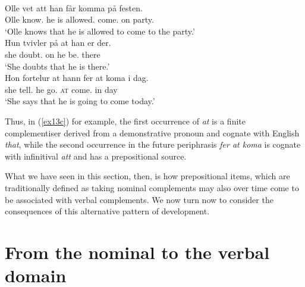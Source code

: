 \documentclass[output=paper]{langsci/langscibook}
\begin{document}
\begin{exe}
\ex\label{ex13}
\begin{xlist}
\ex\label{ex13a} \\
\gll Olle vet att han f\aa r komma {p\aa} festen.\\
Olle know.\Prs{} \Comp{} he {is allowed.\Prs{}} come.\Inf{} on party.\Def{}\\
\trans \enquote*{Olle knows that he is allowed to come to the party.}
\ex\label{ex13b} \\
\gll Hun tvivler {p\aa} at han er der.\\
she doubt.\Prs{} on \Comp{} he be.\Prs{} there\\
\trans \enquote*{She doubts that he is there.}
\ex\label{ex13c} \\
\gll Hon fortelur at hann fer at koma i dag.\\
she tell.\Prs{} \Comp{} he go.\Prs{} \textsc{at} come.\Inf{} in day\\
\trans \enquote*{She says that he is going to come today.}
\end{xlist}	\end{exe}

Thus, in (\ref{ex13c}) for example, the first occurrence of \emph{at} is a
finite complementiser derived from a demonstrative pronoun and cognate with
English \emph{that}, while the second occurrence in the future periphrasis
\emph{fer at koma} is cognate with  infinitival \emph{att} and has a
prepositional source.

What we have seen in this section, then, is how prepositional items, which are
traditionally defined as taking nominal complements may also over time come to
be associated with verbal complements. We now turn now to consider the
consequences of this alternative pattern of development.

\section{From the nominal to the verbal domain}\label{sec:08.7}
\end{document}
